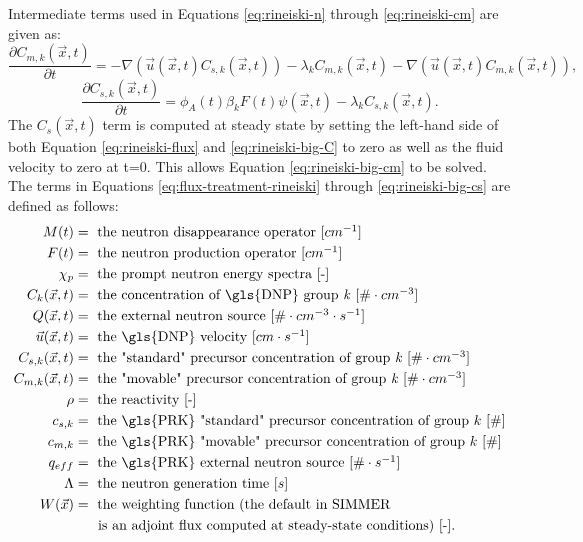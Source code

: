 Intermediate terms used in Equations \eqref{eq:rineiski-n} through \eqref{eq:rineiski-cm} are given as:
\begin{equation}
    \frac{\partial C_{m, k}(\vec{x}, t)}{\partial t} = - \nabla \left( \vec{u}(\vec{x}, t) C_{s, k} (\vec{x}, t) \right) - \lambda_k C_{m, k}(\vec{x}, t) - \nabla \left( \vec{u}(\vec{x}, t) C_{m, k}(\vec{x}, t)\right),
    \label{eq:rineiski-big-cm}
\end{equation}
\begin{equation}
    \frac{\partial C_{s, k}(\vec{x}, t)}{\partial t} = \phi_A(t) \beta_k F(t) \psi (\vec{x}, t) - \lambda_k C_{s, k}(\vec{x}, t).
    \label{eq:rineiski-big-cs}
\end{equation}
The $C_s(\vec{x}, t)$ term is computed at steady state by setting the left-hand side of both Equation \eqref{eq:rineiski-flux} and \eqref{eq:rineiski-big-C} to zero as well as the fluid velocity to zero at t=0.
This allows Equation \eqref{eq:rineiski-big-cm} to be solved.
The terms in Equations \eqref{eq:flux-treatment-rineiski} through \eqref{eq:rineiski-big-cs} are defined as follows:
\begin{align}
M(t) &= \mbox{ the neutron disappearance operator [$cm^{-1}$] } \nonumber \\
F(t) &= \mbox{ the neutron production operator [$cm^{-1}$]} \nonumber \\
\chi_p &= \mbox{ the prompt neutron energy spectra [-]} \nonumber \\
C_k(\vec{x}, t) &= \mbox{ the concentration of \gls{DNP} group \textit{k} [$\# \cdot cm^{-3}$] } \nonumber \\
Q(\vec{x}, t) &= \mbox{ the external neutron source [$\# \cdot cm^{-3} \cdot s^{-1}$] } \nonumber \\
\vec{u}(\vec{x}, t) &= \mbox{ the \gls{DNP} velocity [$cm \cdot s^{-1}$]} \nonumber \\
C_{s, k}(\vec{x}, t) &= \mbox{ the "standard" precursor concentration of group \textit{k} [$\# \cdot cm^{-3}$] } \nonumber \\
C_{m, k}(\vec{x}, t) &= \mbox{ the "movable" precursor concentration of group \textit{k} [$\# \cdot cm^{-3}$] } \nonumber \\
\rho &= \mbox{ the reactivity [-]} \nonumber \\
c_{s, k} &= \mbox{ the \gls{PRK} "standard" precursor concentration of group $k$ [$\#$]} \nonumber \\
c_{m, k} &= \mbox{ the \gls{PRK} "movable" precursor concentration of group $k$ [$\#$]} \nonumber \\
q_{eff} &= \mbox{ the \gls{PRK} external neutron source [$\# \cdot s^{-1}$] } \nonumber \\
\Lambda &= \mbox{ the neutron generation time [$s$]} \nonumber \\
W(\vec{x}) &= \mbox{ the weighting function (the default in SIMMER} \nonumber\\
&\;\;\;\;\; \mbox{ is an adjoint flux computed at steady-state conditions) [-].} \nonumber
\end{align}

